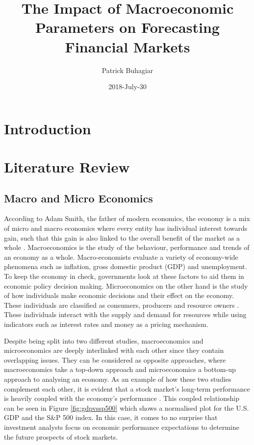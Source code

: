 \documentclass{UoYCSproject}
\author{Patrick Buhagiar}
\title{The Impact of Macroeconomic Parameters on Forecasting Financial Markets}
\date{2018-July-30}
\begin{document}
\maketitle

\listoffigures
\listoftables

\label{sec:start}
\thispagestyle{empty}\cleardoublepage

\chapter{Introduction}
\label{cha:Introduction}

\chapter{Literature Review}
\label{cha:literaturereview}

\section{Macro and Micro Economics}
\label{macroandmicro}
According to Adam Smith, the father of modern economics, the economy is a mix of micro and macro economics where every entity has individual interest towards gain, such that this gain is also linked to the overall benefit of the market as a whole \cite{smith1950inquiry}. Macroeconomics is the study of the behaviour, performance and trends of an economy as a whole. Macro-economists evaluate a variety of economy-wide phenomena such as inflation, gross domestic product (GDP) and unemployment. To keep the economy in check, governments look at these factors to aid them in economic policy decision making. Microeconomics on the other hand is the study of how individuals make economic decisions and their effect on the economy. These individuals are classified as consumers, producers and resource owners \cite{dwivedi2002microeconomics}. These individuals interact with the supply and demand for resources while using indicators such as interest rates and money as a pricing mechanism. 

Despite being split into two different studies, macroeconomics and microeconomics are deeply interlinked with each other since they contain overlapping issues. They can be considered as opposite approaches, where macroeconomics take a top-down approach and microeconomics a bottom-up approach to analysing an economy. As an example of how these two studies complement each other, it is evident that a stock market's long-term performance is heavily coupled with the economy's performance \cite{davis2008macroeconomic}. This coupled relationship can be seen in Figure \ref{fig:gdpvssp500} which shows a normalised plot for the U.S. GDP and the S\&P 500 index. In this case, it comes to no surprise that investment analysts focus on economic performance expectations to determine the future prospects of stock markets.
\end{document}
